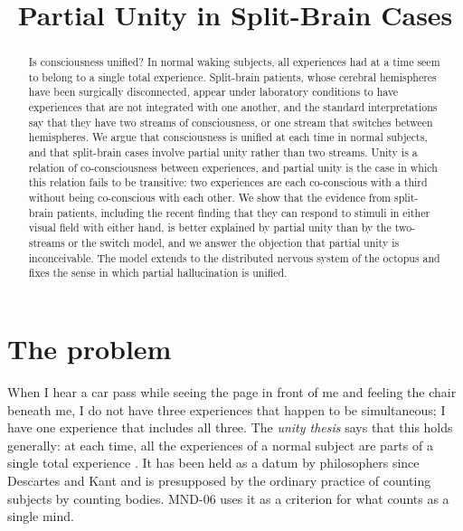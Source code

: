 \documentclass{situationist-preprint}
\title{Partial Unity in Split-Brain Cases}
\begin{document}
\maketitle

\begin{abstract}
Is consciousness unified? In normal waking subjects, all experiences had at a time seem to belong to a single total experience. Split-brain patients, whose cerebral hemispheres have been surgically disconnected, appear under laboratory conditions to have experiences that are not integrated with one another, and the standard interpretations say that they have two streams of consciousness, or one stream that switches between hemispheres. We argue that consciousness is unified at each time in normal subjects, and that split-brain cases involve partial unity rather than two streams. Unity is a relation of co-consciousness between experiences, and partial unity is the case in which this relation fails to be transitive: two experiences are each co-conscious with a third without being co-conscious with each other. We show that the evidence from split-brain patients, including the recent finding that they can respond to stimuli in either visual field with either hand, is better explained by partial unity than by the two-streams or the switch model, and we answer the objection that partial unity is inconceivable. The model extends to the distributed nervous system of the octopus and fixes the sense in which partial hallucination is unified.
\end{abstract}

\section{The problem}

When I hear a car pass while seeing the page in front of me and feeling the chair beneath me, I do not have three experiences that happen to be simultaneous; I have one experience that includes all three. The \emph{unity thesis} says that this holds generally: at each time, all the experiences of a normal subject are parts of a single total experience \citep{BayneChalmers2003,Bayne2010}. It has been held as a datum by philosophers since Descartes and Kant and is presupposed by the ordinary practice of counting subjects by counting bodies. MND-06 uses it as a criterion for what counts as a single mind.
\end{document}

